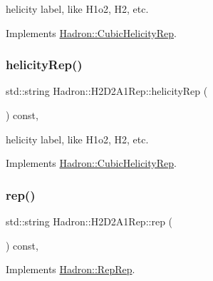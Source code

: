 helicity label, like H1o2, H2, etc. 

Implements \mbox{\hyperlink{structHadron_1_1CubicHelicityRep_af1096946b7470edf0a55451cc662f231}{Hadron\+::\+Cubic\+Helicity\+Rep}}.

\mbox{\label{structHadron_1_1H2D2A1Rep_a53e9f8aa22d8ccbeb585c9cf56440392}} 
\subsubsection{\texorpdfstring{helicityRep()}{helicityRep()}\hspace{0.1cm}{\footnotesize\ttfamily [2/2]}}
{\footnotesize\ttfamily std\+::string Hadron\+::\+H2\+D2\+A1\+Rep\+::helicity\+Rep (\begin{DoxyParamCaption}{ }\end{DoxyParamCaption}) const\hspace{0.3cm}{\ttfamily [inline]}, {\ttfamily [virtual]}}

helicity label, like H1o2, H2, etc. 

Implements \mbox{\hyperlink{structHadron_1_1CubicHelicityRep_af1096946b7470edf0a55451cc662f231}{Hadron\+::\+Cubic\+Helicity\+Rep}}.

\mbox{\label{structHadron_1_1H2D2A1Rep_a3280d932c7c579f85dedbde3a8e0f36f}} 
\subsubsection{\texorpdfstring{rep()}{rep()}\hspace{0.1cm}{\footnotesize\ttfamily [1/3]}}
{\footnotesize\ttfamily std\+::string Hadron\+::\+H2\+D2\+A1\+Rep\+::rep (\begin{DoxyParamCaption}{ }\end{DoxyParamCaption}) const\hspace{0.3cm}{\ttfamily [inline]}, {\ttfamily [virtual]}}



Implements \mbox{\hyperlink{structHadron_1_1RepRep_ab3213025f6de249f7095892109575fde}{Hadron\+::\+Rep\+Rep}}.

\mbox{\label{structHadron_1_1H2D2A1Rep_a3280d932c7c579f85dedbde3a8e0f36f}} 
